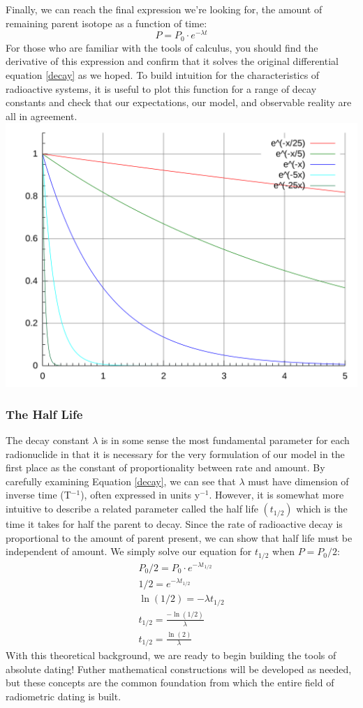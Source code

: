 \documentclass[addpoints, 12pt]{exam}
\begin{document}
Finally, we can reach the final expression we're looking for, the amount of remaining parent isotope as a function of time:
\begin{equation}
	\boxed{P=P_0\cdot e^{-\lambda t}}
\end{equation}
For those who are familiar with the tools of calculus, you should find the derivative of this expression and confirm that it solves the original differential equation \ref{decay} as we hoped. To build intuition for the characteristics of radioactive systems, it is useful to plot this function for a range of decay constants and check that our expectations, our model, and observable reality are all in agreement.
\includegraphics[width=\textwidth]{decay.png}
\subsubsection*{The Half Life}
The decay constant $\lambda$ is in some sense the most fundamental parameter for each radionuclide in that it is necessary for the very formulation of our model in the first place as the constant of proportionality between rate and amount. By carefully examining Equation \ref{decay}, we can see that $\lambda$ must have dimension of inverse time (T$^{-1}$), often expressed in units y$^{-1}$. However, it is somewhat more intuitive to describe a related parameter called the half life $(t_{1/2})$ which is the time it takes for half the parent to decay. Since the rate of radioactive decay is proportional to the amount of parent present, we can show that half life must be independent of amount. We simply solve our equation for $t_{1/2}$ when $P=P_0/2$:
\begin{gather}
	P_0/2=P_0\cdot e^{-\lambda t_{1/2}}\nonumber\\
	1/2=e^{-\lambda t_{1/2}}\nonumber\\
	\ln(1/2)=-\lambda t_{1/2}\nonumber\\
	t_{1/2}=\frac{-\ln(1/2)}{\lambda}\nonumber\\
	\boxed{t_{1/2}=\frac{\ln(2)}{\lambda}}
\end{gather}
With this theoretical background, we are ready to begin building the tools of absolute dating! Futher mathematical constructions will be developed as needed, but these concepts are the common foundation from which the entire field of radiometric dating is built.
\end{document}
